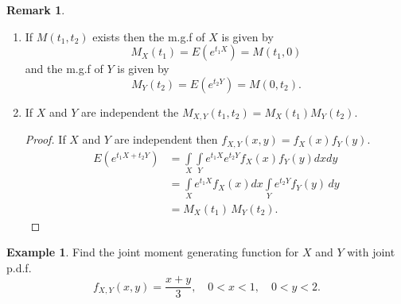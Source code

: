 \documentclass[12pt,a4paper]{report}
\theoremstyle{definition}
\newtheorem{example}[thm]{Example}
\newtheorem{remark}[thm]{Remark}
\theoremstyle{plain}
\theoremstyle{definition}
\begin{document}
\begin{remark}
\textbf{ }
\begin{enumerate}
\item If $M(t_1,t_2)$ exists then the m.g.f of $X$ is given by \[M_X(t_1) = E\left(e^{t_1X}\right) = M(t_1,0)\] and the m.g.f of $Y$ is given by \[M_Y(t_2) = E\left(e^{t_2Y}\right) = M(0,t_2).\]
\item If $X$ and $Y$ are independent the $M_{X,Y}(t_1,t_2)=M_X(t_1)M_Y(t_2)$.
\begin{proof}
If $X$ and $Y$ are independent then $f_{X,Y}(x,y)=f_X(x)f_Y(y)$.
\begin{align*}
E\left(e^{t_1X + t_2Y}\right) & = \int\limits_X\int\limits_Ye^{t_1X}e^{t_2Y}f_X(x)f_Y(y)dxdy\\
                                                   & = \int\limits_Xe^{t_1X}f_X(x)dx\int\limits_Ye^{t_2Y}f_Y(y)\,dy\\
                                                   & = M_X(t_1)\, M_Y(t_2).
\end{align*}
\end{proof} 
\end{enumerate}
\end{remark}







\begin{example}
Find the joint moment generating function for $X$ and $Y$ with joint p.d.f.
\[f_{X,Y}(x,y)=\frac{x+y}{3},\quad 0<x<1,\quad 0<y<2.\]
\end{example}
\end{document}
